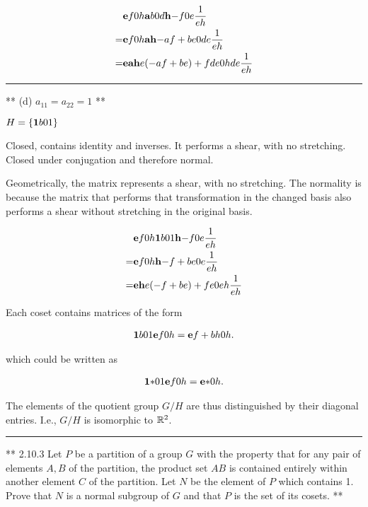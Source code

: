 \begin{align*}
&\mathbf{e}{f}
     {0}{h} \mathbf{a}{b}
                {0}{d} \mathbf{h}{-f}
                           {0}{e } \frac{1}{eh} \\
= &\mathbf{e}{f}
       {0}{h} \mathbf{ah}{-af + be}
                  {0 }{de      } \frac{1}{eh} \\
= &\mathbf{eah}{e(-af + be) + fde}
       {0  }{hde              } \frac{1}{eh}
\end{align*}


\hrule
** (d) $a_{11} = a_{22} = 1$ **

$H = \left\{ \mathbf{1}{b}
                 {0}{1} \right\}$

Closed, contains identity and inverses. It performs a shear, with no
stretching. Closed under conjugation and therefore normal.

Geometrically, the matrix represents a shear, with no stretching. The normality
is because the matrix that performs that transformation in the changed basis
also performs a shear without stretching in the original basis.


\begin{align*}
&\mathbf{e}{f}
     {0}{h} \mathbf{1}{b}
                {0}{1} \mathbf{h}{-f}
                           {0}{e} \frac{1}{eh} \\
= &\mathbf{e}{f}
       {0}{h} \mathbf{h}{-f + be}
                  {0}{e      } \frac{1}{eh} \\
= &\mathbf{eh}{e(-f + be) + fe}
       {0  }{eh             } \frac{1}{eh}
\end{align*}

Each coset contains matrices of the form

\begin{align*}
\mathbf{1}{b}
    {0}{1} \mathbf{e}{f}
               {0}{h} = \mathbf{e}{f + bh}
                            {0}{h     }.
\end{align*}

which could be written as

\begin{align*}
\mathbf{1}{*}
    {0}{1} \mathbf{e}{f}
               {0}{h} = \mathbf{e}{*}
                            {0}{h}.
\end{align*}

The elements of the quotient group $G/H$ are thus distinguished by their
diagonal entries. I.e., $G/H$ is isomorphic to $\mathbb{R}^2$.


\hrule

** 2.10.3 Let $P$ be a partition of a group $G$ with the property that for any
pair of elements $A, B$ of the partition, the product set $AB$ is contained
entirely within another element $C$ of the partition. Let $N$ be the element of
$P$ which contains 1. Prove that $N$ is a normal subgroup of $G$ and that $P$
is the set of its cosets. **

